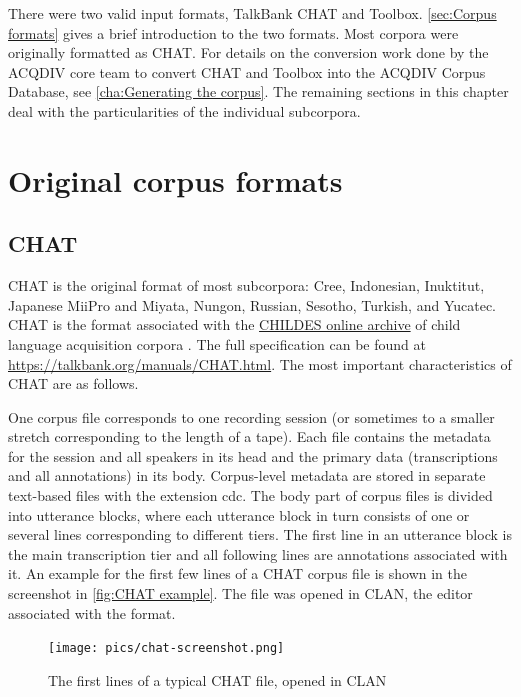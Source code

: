 \documentclass[a4paper, 11pt]{book}
\begin{document}
There were two valid input formats, TalkBank CHAT and Toolbox. \autoref{sec:Corpus formats} gives a brief introduction to the two formats. Most corpora were originally formatted as CHAT. For details on the conversion work done by the ACQDIV core team to convert CHAT and Toolbox into the ACQDIV Corpus Database, see \autoref{cha:Generating the corpus}. The remaining sections in this chapter deal with the particularities of the individual subcorpora. 

\section{Original corpus formats}
\label{sec:Corpus formats}

\subsection{CHAT}
\label{subsec:CHAT}

CHAT is the original format of most subcorpora: Cree, Indonesian, Inuktitut, Japanese MiiPro and Miyata, Nungon, Russian, Sesotho, Turkish, and Yucatec. CHAT is the format associated with the \href{http://childes.psy.cmu.edu/}{CHILDES online archive} of child language acquisition corpora \citep{MacWhinney2000a}. The full specification can be found at \url{https://talkbank.org/manuals/CHAT.html}. The most important characteristics of CHAT are as follows. 

One corpus file corresponds to one recording session (or sometimes to a smaller stretch corresponding to the length of a tape). Each file contains the metadata for the session and all speakers in its head and the primary data (transcriptions and all annotations) in its body. Corpus-level metadata are stored in separate text-based files with the extension cdc. The body part of corpus files is divided into utterance blocks, where each utterance block in turn consists of one or several lines corresponding to different tiers. The first line in an utterance block is the main transcription tier and all following lines are annotations associated with it. An example for the first few lines of a CHAT corpus file is shown in the screenshot in \autoref{fig:CHAT example}. The file was opened in CLAN, the editor associated with the format. 

\begin{figure}[ht!]
	\centering
	\texttt{[image: pics/chat-screenshot.png]}
	\caption{The first lines of a typical CHAT file, opened in CLAN}
	\label{fig:CHAT example}
\end{figure}
\end{document}
